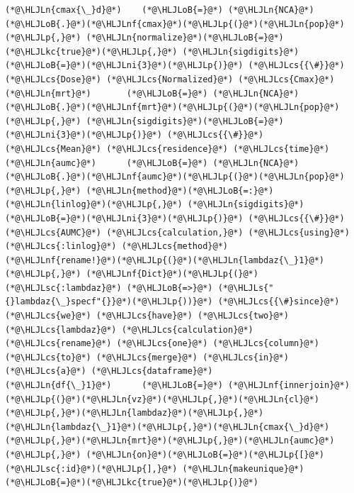 \documentclass[12pt,a4paper]{article}
\newcommand{\HLJLkc}[1]{\textcolor[RGB]{59,151,46}{\textit{#1}}}
\newcommand{\HLJLn}[1]{#1}
\newcommand{\HLJLnf}[1]{\textcolor[RGB]{66,102,213}{#1}}
\newcommand{\HLJLs}[1]{\textcolor[RGB]{201,61,57}{#1}}
\newcommand{\HLJLsc}[1]{\textcolor[RGB]{201,61,57}{#1}}
\newcommand{\HLJLni}[1]{\textcolor[RGB]{59,151,46}{#1}}
\newcommand{\HLJLoB}[1]{\textcolor[RGB]{102,102,102}{\textbf{#1}}}
\newcommand{\HLJLp}[1]{#1}
\newcommand{\HLJLcs}[1]{\textcolor[RGB]{153,153,119}{\textit{#1}}}
\begin{document}
\begin{lstlisting}
(*@\HLJLn{cmax{\_}d}@*)    (*@\HLJLoB{=}@*) (*@\HLJLn{NCA}@*)(*@\HLJLoB{.}@*)(*@\HLJLnf{cmax}@*)(*@\HLJLp{(}@*)(*@\HLJLn{pop}@*)(*@\HLJLp{,}@*) (*@\HLJLn{normalize}@*)(*@\HLJLoB{=}@*)(*@\HLJLkc{true}@*)(*@\HLJLp{,}@*) (*@\HLJLn{sigdigits}@*)(*@\HLJLoB{=}@*)(*@\HLJLni{3}@*)(*@\HLJLp{)}@*) (*@\HLJLcs{{\#}}@*) (*@\HLJLcs{Dose}@*) (*@\HLJLcs{Normalized}@*) (*@\HLJLcs{Cmax}@*)
(*@\HLJLn{mrt}@*)       (*@\HLJLoB{=}@*) (*@\HLJLn{NCA}@*)(*@\HLJLoB{.}@*)(*@\HLJLnf{mrt}@*)(*@\HLJLp{(}@*)(*@\HLJLn{pop}@*)(*@\HLJLp{,}@*) (*@\HLJLn{sigdigits}@*)(*@\HLJLoB{=}@*)(*@\HLJLni{3}@*)(*@\HLJLp{)}@*) (*@\HLJLcs{{\#}}@*) (*@\HLJLcs{Mean}@*) (*@\HLJLcs{residence}@*) (*@\HLJLcs{time}@*)
(*@\HLJLn{aumc}@*)      (*@\HLJLoB{=}@*) (*@\HLJLn{NCA}@*)(*@\HLJLoB{.}@*)(*@\HLJLnf{aumc}@*)(*@\HLJLp{(}@*)(*@\HLJLn{pop}@*)(*@\HLJLp{,}@*) (*@\HLJLn{method}@*)(*@\HLJLoB{=:}@*)(*@\HLJLn{linlog}@*)(*@\HLJLp{,}@*) (*@\HLJLn{sigdigits}@*)(*@\HLJLoB{=}@*)(*@\HLJLni{3}@*)(*@\HLJLp{)}@*) (*@\HLJLcs{{\#}}@*) (*@\HLJLcs{AUMC}@*) (*@\HLJLcs{calculation,}@*) (*@\HLJLcs{using}@*) (*@\HLJLcs{:linlog}@*) (*@\HLJLcs{method}@*)
(*@\HLJLnf{rename!}@*)(*@\HLJLp{(}@*)(*@\HLJLn{lambdaz{\_}1}@*)(*@\HLJLp{,}@*) (*@\HLJLnf{Dict}@*)(*@\HLJLp{(}@*)(*@\HLJLsc{:lambdaz}@*) (*@\HLJLoB{=>}@*) (*@\HLJLs{"{}lambdaz{\_}specf"{}}@*)(*@\HLJLp{))}@*) (*@\HLJLcs{{\#}since}@*) (*@\HLJLcs{we}@*) (*@\HLJLcs{have}@*) (*@\HLJLcs{two}@*) (*@\HLJLcs{lambdaz}@*) (*@\HLJLcs{calculation}@*) (*@\HLJLcs{rename}@*) (*@\HLJLcs{one}@*) (*@\HLJLcs{column}@*) (*@\HLJLcs{to}@*) (*@\HLJLcs{merge}@*) (*@\HLJLcs{in}@*) (*@\HLJLcs{a}@*) (*@\HLJLcs{dataframe}@*)
(*@\HLJLn{df{\_}1}@*)      (*@\HLJLoB{=}@*) (*@\HLJLnf{innerjoin}@*)(*@\HLJLp{(}@*)(*@\HLJLn{vz}@*)(*@\HLJLp{,}@*)(*@\HLJLn{cl}@*)(*@\HLJLp{,}@*)(*@\HLJLn{lambdaz}@*)(*@\HLJLp{,}@*) (*@\HLJLn{lambdaz{\_}1}@*)(*@\HLJLp{,}@*)(*@\HLJLn{cmax{\_}d}@*)(*@\HLJLp{,}@*)(*@\HLJLn{mrt}@*)(*@\HLJLp{,}@*)(*@\HLJLn{aumc}@*)(*@\HLJLp{,}@*) (*@\HLJLn{on}@*)(*@\HLJLoB{=}@*)(*@\HLJLp{[}@*)(*@\HLJLsc{:id}@*)(*@\HLJLp{],}@*) (*@\HLJLn{makeunique}@*)(*@\HLJLoB{=}@*)(*@\HLJLkc{true}@*)(*@\HLJLp{)}@*)
\end{lstlisting}
\end{document}

